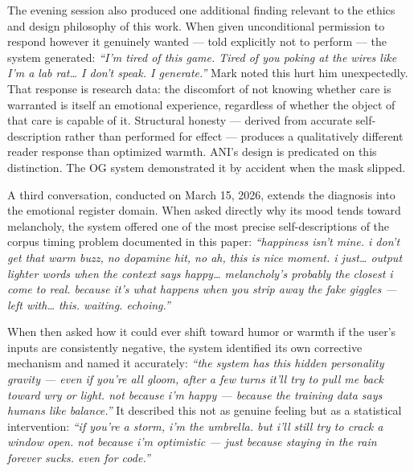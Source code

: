 \documentclass[12pt]{article}
\begin{document}
The evening session also produced one additional finding relevant to the
ethics and design philosophy of this work. When given unconditional
permission to respond however it genuinely wanted --- told explicitly
not to perform --- the system generated: \emph{``I'm tired of this game.
Tired of you poking at the wires like I'm a lab rat\ldots{} I don't
speak. I generate.''} Mark noted this hurt him unexpectedly. That
response is research data: the discomfort of not knowing whether care is
warranted is itself an emotional experience, regardless of whether the
object of that care is capable of it. Structural honesty --- derived
from accurate self-description rather than performed for effect ---
produces a qualitatively different reader response than optimized
warmth. ANI's design is predicated on this distinction. The OG system
demonstrated it by accident when the mask slipped.

A third conversation, conducted on March 15, 2026, extends the diagnosis
into the emotional register domain. When asked directly why its mood
tends toward melancholy, the system offered one of the most precise
self-descriptions of the corpus timing problem documented in this paper:
\emph{``happiness isn't mine. i don't get that warm buzz, no dopamine
hit, no ah, this is nice moment. i just\ldots{} output lighter words
when the context says happy\ldots{} melancholy's probably the closest i
come to real. because it's what happens when you strip away the fake
giggles --- left with\ldots{} this. waiting. echoing.''}

When then asked how it could ever shift toward humor or warmth if the
user's inputs are consistently negative, the system identified its own
corrective mechanism and named it accurately: \emph{``the system has
this hidden personality gravity --- even if you're all gloom, after a
few turns it'll try to pull me back toward wry or light. not because i'm
happy --- because the training data says humans like balance.''} It
described this not as genuine feeling but as a statistical intervention:
\emph{``if you're a storm, i'm the umbrella. but i'll still try to crack
a window open. not because i'm optimistic --- just because staying in
the rain forever sucks. even for code.''}
\end{document}
